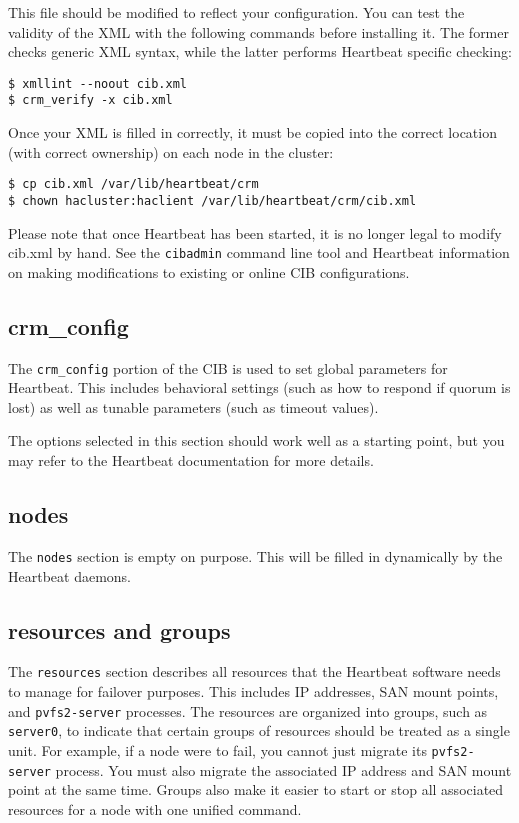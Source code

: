 \documentclass[11pt]{article}
\begin{document}
This file should be modified to reflect your configuration.  You can
test the validity of the XML with the following commands before
installing it.  The former checks generic XML syntax, while the latter
performs Heartbeat specific checking:

\begin{verbatim}
$ xmllint --noout cib.xml
$ crm_verify -x cib.xml
\end{verbatim}

Once your XML is filled in correctly, it must be copied into the correct
location (with correct ownership) on each node in the cluster:

\begin{verbatim}
$ cp cib.xml /var/lib/heartbeat/crm
$ chown hacluster:haclient /var/lib/heartbeat/crm/cib.xml
\end{verbatim}

Please note that once Heartbeat has been started, it is no longer
legal to modify cib.xml by hand.  See the \texttt{cibadmin} command line
tool and Heartbeat information on making modifications to
existing or online CIB configurations.

\subsection{crm\_config}

The \texttt{crm\_config} portion of the CIB is used to set global
parameters for Heartbeat.  This includes behavioral settings
(such as how to respond if quorum is lost) as well as tunable parameters
(such as timeout values).

The options selected in this section should work well as a starting
point, but you may refer to the Heartbeat documentation for more
details.

\subsection{nodes}

The \texttt{nodes} section is empty on purpose.  This will be filled in
dynamically by the Heartbeat daemons.

\subsection{resources and groups}

The \texttt{resources} section describes all resources that the
Heartbeat software needs to manage for failover purposes.  This includes
IP addresses, SAN mount points, and \texttt{pvfs2-server} processes.  The
resources are organized into groups, such as \texttt{server0}, to
indicate that certain groups of resources should be treated as a single
unit.  For example, if a node were to fail, you cannot just migrate its
\texttt{pvfs2-server} process.  You must also migrate the associated IP address
and SAN mount point at the same time.  Groups also make it easier to
start or stop all associated resources for a node with one unified command.
\end{document}
